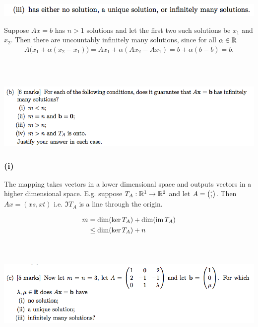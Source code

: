 \documentclass[12pt]{article}
\begin{document}
\subsubsection*{} %
\begin{mdframed}
\includegraphics[width=400pt]{img/oxford-prelims-2017-A-2-1-3.png}
\end{mdframed}

Suppose $Ax = b$ has $n > 1$ solutions and let the first two such solutions be
$x_1$ and $x_2$. Then there are uncountably infinitely many solutions, since
for all $\alpha \in \mathbb{R}$
\begin{align*}
A\Big(x_1 + \alpha (x_2 - x_1)\Big) = Ax_1 + \alpha(Ax_2 - Ax_1) = b + \alpha(b - b) = b.
\end{align*}

~\\
\subsection*{} %
\begin{mdframed}
\includegraphics[width=400pt]{img/oxford-prelims-2017-A-2-2.png}
\end{mdframed}

\subsubsection*{(i)} The mapping takes vectors in a lower dimensional space and
outputs vectors in a higher dimensional space. E.g. suppose $T_A:\mathbb{R}^1 \to \mathbb{R}^2$
and let $A = \tiny{\begin{pmatrix}s\\t\end{pmatrix}}$. Then $Ax = (xs, xt)$ i.e. $\Im T_A$ is a line
through the origin.

\begin{align*}
  m &=    \dim(\ker T_A) + \dim(\operatorname{\text{im}} T_A)\\
    &\leq \dim(\ker T_A) + n\\
\end{align*}
~\\
\subsection*{} %
\begin{mdframed}
\includegraphics[width=400pt]{img/oxford-prelims-2017-A-2-3.png}
\end{mdframed}
\end{document}
